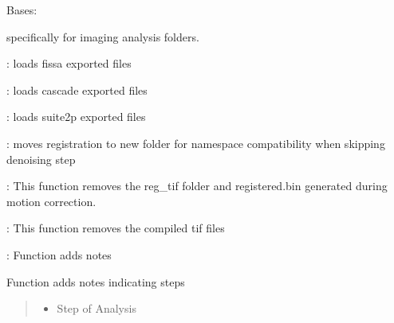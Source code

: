 \documentclass[letterpaper,10pt,english]{sphinxmanual}
\begin{document}
\begin{fulllineitems}
\label{\detokenize{Organization:Organization.ImagingAnalysis}}
\pysigstartsignatures
{}
\pysigstopsignatures
\sphinxAtStartPar
Bases: {\hyperref[\detokenize{Organization:Organization.Data}]{}}

\sphinxAtStartPar
{} specifically for imaging analysis folders.
\begin{description}
\begin{DUlineblock}{0em}
\item[]  : loads fissa exported files
\item[]  : loads cascade exported files
\item[]  : loads suite2p exported files
\item[]  : moves registration to new folder for namespace compatibility when skipping denoising step
\item[]  : This function removes the reg\_tif folder and registered.bin generated during motion correction.
\item[]  : This function removes the compiled tif files
\item[]  : Function adds notes
\end{DUlineblock}

\end{description}

\begin{fulllineitems}
\label{\detokenize{Organization:Organization.ImagingAnalysis.add_notes}}
\pysigstartsignatures
{}
\pysigstopsignatures
\sphinxAtStartPar
Function adds notes indicating steps
\begin{quote}\begin{description}
\begin{itemize}
\item {} 
\sphinxAtStartPar
{} \textendash{} Step of Analysis


\end{itemize}
\end{description}
\end{quote}
\end{fulllineitems}
\end{fulllineitems}
\end{document}
